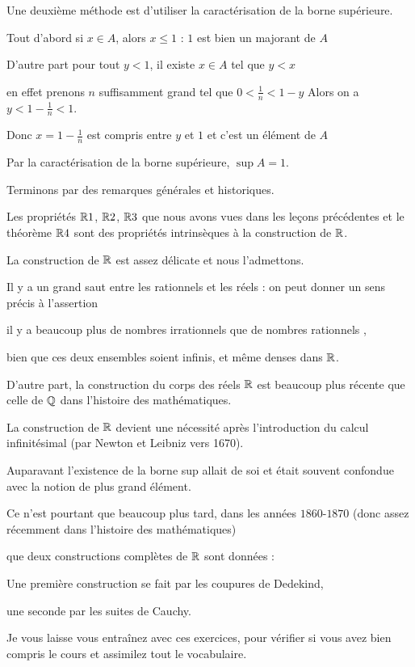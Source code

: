 \change


Une deuxième méthode est d'utiliser la caractérisation de la borne supérieure. 

\change

Tout d'abord si $x\in A$, alors $x\leq 1$ : $1$ est bien un majorant de $A$

\change

D'autre part pour tout $y< 1$, il existe $x\in A$ tel que $y<x$  

\change

 en effet prenons $n$ suffisamment grand tel que
$0<\frac 1n < 1-y$
 Alors on a $y < 1-\frac 1n < 1$. 

\change

Donc $x=1-\frac 1n$ est compris entre $y$ et $1$ et c'est un élément de $A$

Par la caractérisation de la borne supérieure, $\sup A=1$.


\diapo


Terminons par des remarques générales et historiques.


Les propriétés $\mathbb{R}1$, $\mathbb{R}2$, $\mathbb{R}3$ que nous avons vues dans les leçons précédentes et le théorème $\mathbb{R}4$ 
sont des propriétés intrinsèques à la construction de $\mathbb{R}$.


La construction de $\mathbb{R}$ est assez délicate et nous l'admettons.

\change

Il y a un grand saut entre les rationnels et les réels :
on peut donner un sens précis à l'assertion

 \og{} il y a beaucoup plus de nombres irrationnels que de nombres rationnels \fg{}, 

bien que ces deux ensembles soient infinis, et m\^eme denses dans $\mathbb{R}$.



D'autre part, la construction du corps des réels $\mathbb{R}$ est beaucoup plus récente 
que celle de $\mathbb{Q}$ dans l'histoire des mathématiques.

\change

La construction de $\mathbb{R}$ devient une nécessité après l'introduction 
du calcul infinitésimal (par Newton et Leibniz vers 1670). 

 Auparavant l'existence de la borne sup allait de soi et était souvent confondue avec la notion de plus grand élément.

\change

Ce n'est pourtant que beaucoup plus tard, dans les années $1860$-$1870$ 
(donc assez récemment dans l'histoire des mathématiques) 

que deux constructions complètes de $\mathbb{R}$ sont données :

Une première construction se fait par les coupures de Dedekind,

une seconde par les suites de Cauchy. 


\diapo

Je vous laisse vous entraînez avec ces exercices, 
pour vérifier si vous avez bien compris le cours et assimilez tout le vocabulaire.

